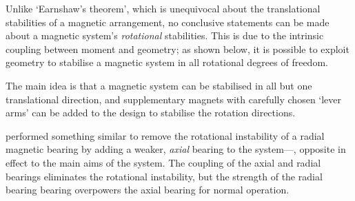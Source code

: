 \documentclass[11pt,a4paper]{memoir}
\begin{document}
Unlike `Earnshaw's theorem', which is unequivocal about the
translational stabilities of a magnetic arrangement, no conclusive
statements can be made about a magnetic system's \emph{rotational}
stabilities. This is due to the intrinsic coupling between moment and
geometry; as shown below, it is possible to exploit geometry to
stabilise a magnetic system in all rotational degrees of freedom.

The main idea is that a magnetic system can be
stabilised in all but one translational direction, and
supplementary magnets with carefully chosen `lever arms' can be added to the design to stabilise the
rotation directions.

\textcite{delamare1994} performed something similar to remove the
rotational instability of a radial magnetic bearing by adding a
weaker, \emph{axial} bearing to the system—\ie, opposite in effect
to the main aims of the system. The coupling of the axial and radial
bearings eliminates the rotational instability, but the strength of
the radial bearing bearing overpowers the axial bearing for normal
operation.
\end{document}

